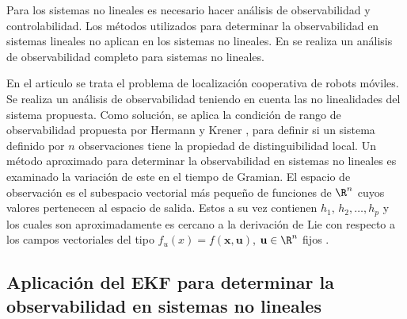 Para los sistemas no lineales es necesario hacer análisis de observabilidad y controlabilidad.
Los métodos utilizados para determinar la observabilidad en sistemas lineales no aplican en los sistemas no lineales.
En \cite{Hermann1977} se realiza un análisis de observabilidad completo para sistemas no lineales.\par
En el articulo \cite{Martinelli2011} se trata el problema de localización cooperativa de robots móviles.%
Se realiza un análisis de observabilidad teniendo en cuenta las no linealidades del sistema propuesta.
Como solución, se aplica la condición de rango de observabilidad propuesta por Hermann y Krener \cite{Hermann1977}, 
para definir si un sistema definido por $n$ observaciones tiene la propiedad de distinguibilidad local.
Un método aproximado para determinar la observabilidad en sistemas no lineales es examinado la variación de este en el tiempo de Gramian.
El espacio de observación es el subespacio vectorial más pequeño de funciones de $\R^n$ cuyos valores pertenecen al espacio de salida.
Estos a su vez contienen $h_1,\,h_2,\ldots,h_p$ y los cuales son aproximadamente es cercano a la derivación de Lie
con respecto a los campos vectoriales del tipo $f_u(x)=f(\mathbf{x},\mathbf{u})$, $\mathbf{u} \in\R^n$ fijos \cite{Martinelli2006}.


\subsection{Aplicación del EKF para determinar la observabilidad en sistemas no lineales}
\label{subsec:ekfnolinealobs}


